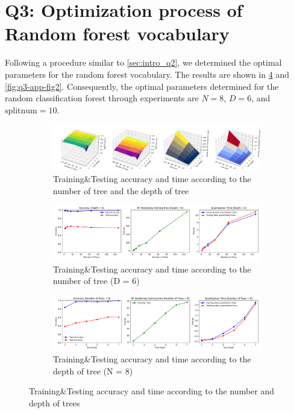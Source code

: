 \section{Q3: Optimization process of Random forest vocabulary}
Following a procedure similar to \cref{sec:intro_q2}, we determined the optimal parameters for the random forest vocabulary. The results are shown in \cref{fig:q3-app-fig1} and \cref{fig:q3-app-fig2}. Consequently, the optimal parameters determined for the random classification forest through experiments are $N=8$, $D=6$, and $\text{splitnum}=10$.

\label{subsec:Q2-app3}
\begin{figure}[htbp]
	\centering
	\begin{subfigure}[H]{0.7\linewidth}
		\centering
		\includegraphics[width=\linewidth]{image/q3-fig1.png}
		\caption{Training\&Testing accuracy and time according to the number of tree and the depth of tree}
		\label{fig:q3-fig1}
	\end{subfigure}
	\begin{subfigure}[H]{0.7\linewidth}
		\centering
		\includegraphics[width=\linewidth]{image/q3-fig2.png}
		\caption{Training\&Testing accuracy and time according to the number of tree (D = 6)}
		\label{fig:q3-fig2}
	\end{subfigure}
	\begin{subfigure}[H]{0.7\linewidth}
		\centering
		\includegraphics[width=\linewidth]{image/q3-fig3.png}
		\caption{Training\&Testing accuracy and time according to the depth of tree (N = 8)}
		\label{fig:q3-fig3}
	\end{subfigure}
	\caption{Training\&Testing accuracy and time according to the number and depth of trees}
	\label{fig:q3-app-fig1}
\end{figure}


